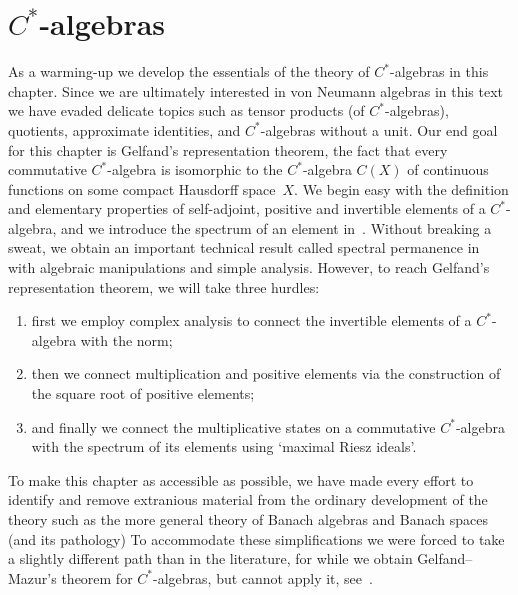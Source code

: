 \documentclass[main]{subfiles}
\begin{document}
\chapter{$C^*$-algebras}
As a warming-up
we develop the essentials of the theory of $C^*$-algebras
in this chapter.
Since we are ultimately interested
in von Neumann algebras in this text
we have evaded
delicate
topics such as tensor products (of $C^*$-algebras), 
quotients, approximate identities,
and $C^*$-algebras without a unit.
Our end goal
for this chapter
is Gelfand's representation theorem,
the fact that every commutative $C^*$-algebra
is isomorphic
to the $C^*$-algebra
$C(X)$ of continuous functions on some compact Hausdorff space~$X$.
We begin easy with the definition and elementary properties
of self-adjoint, positive and invertible elements of a $C^*$-algebra,
and we introduce the spectrum of an element in~\sref{}.
Without breaking a sweat,
we obtain an important technical result
called spectral permanence in~\sref{}
with algebraic manipulations and simple analysis.
However, to reach Gelfand's representation theorem,
we will take three hurdles:
\begin{enumerate}
\item
first we employ complex analysis
to connect the invertible elements of a $C^*$-algebra
with the norm;
\item
then we connect multiplication
and positive elements via the construction of the square root
of positive elements;
\item
and finally we connect the multiplicative states
on a commutative $C^*$-algebra
with the spectrum of its elements
using `maximal Riesz ideals'.
\end{enumerate}
To make this chapter
as accessible as possible,
we have made every effort to identify
and remove
extranious material
from the ordinary development
of the theory
such as the more general theory of Banach algebras
and Banach spaces (and its pathology)
To accommodate these simplifications
we were forced
to take a slightly different path than in the literature,
for while we obtain Gelfand--Mazur's theorem for $C^*$-algebras,
but cannot apply it, see~\sref{}.
\end{document}
